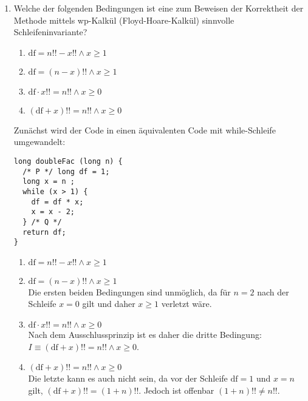 \documentclass{lehramt-informatik-aufgabe}
\begin{document}
\begin{enumerate}


\item Welche der folgenden Bedingungen ist eine zum Beweisen der
Korrektheit der Methode mittels wp-Kalkül (Floyd-Hoare-Kalkül) sinnvolle
Schleifeninvariante?

\begin{enumerate}
\item $\text{df} = n!! - x!! \land x \geq 1$
\item $\text{df} = (n - x)!! \land x \geq 1$
\item $\text{df} \cdot x!! = n!! \land x \geq 0$
\item $(\text{df} + x)!! = n!! \land x \geq 0$
\end{enumerate}

\begin{liAntwort}
Zunächst wird der Code in einen äquivalenten Code mit while-Schleife
umgewandelt:

\begin{verbatim}
long doubleFac (long n) {
  /* P */ long df = 1;
  long x = n ;
  while (x > 1) {
    df = df * x;
    x = x - 2;
  } /* Q */
  return df;
}
\end{verbatim}

\begin{enumerate}
\item $\text{df} = n!! - x!! \land x \geq 1$
\item $\text{df} = (n - x)!! \land x \geq 1$ \\

Die ersten beiden Bedingungen sind unmöglich, da \zB für $n = 2$ nach
der Schleife $x = 0$ gilt und daher $x \geq 1$ verletzt wäre.

\item $\text{df} \cdot x!! = n!! \land x \geq 0$ \\

Nach dem Ausschlussprinzip ist es daher die dritte Bedingung: $I \equiv
(\text{df} + x)!! = n!! \land x \geq 0$.

\item $(\text{df} + x)!! = n!! \land x \geq 0$ \\

Die letzte kann es auch nicht sein, da vor der Schleife $\text{df} = 1$
und $x = n$ gilt, \dh $(\text{df} + x)!! = (1 + n)!!$. Jedoch ist
offenbar $(1 + n)!! \not = n!!$.
\end{enumerate}


\end{liAntwort}
\end{enumerate}
\end{document}
